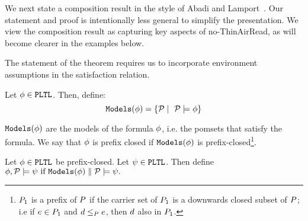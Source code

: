We next state a composition result in the style of Abadi and
Lamport~\cite{Abadi:1993:CS:151646.151649}.  Our statement and proof is
intentionally less general to simplify the presentation.  We view the
composition result as capturing key aspects of no-ThinAirRead, as will become
clearer in the examples below.

The statement of the theorem requires us to incorporate environment
assumptions in the satisfaction relation.
\begin{definition}
  Let $\phi \in {\tt PLTL}$.  Then, define:
  \begin{displaymath} \tt Models{(\phi)} = \{ \mathcal{P} \mid \ \mathcal{P} \models \phi \} \end{displaymath}
\end{definition}
$\tt Models{(\phi)}$ are the models of the formula $\phi$, i.e. the pomsets that
satisfy the formula.  We say that $\phi$ is prefix closed if $\tt Models{(\phi)}$
is prefix-closed\footnote{$P_1$ is a prefix of $P$ if the carrier set
  of $P_1$ is a downwards closed subset of $P$; i.e if
  $e \in P_1$ and $ d \le_{P} e$, then $d$ also in
  $P_1$.}.

Let $\phi \in {\tt PLTL}$ be prefix-closed.  Let $ \psi \in {\tt PLTL}$.  Then define
\begin{math}
  \phi, \mathcal{P} \models \psi  \mbox{ if } \tt Models{(\phi)} \parallel \mathcal{P} \models \psi.
\end{math}

